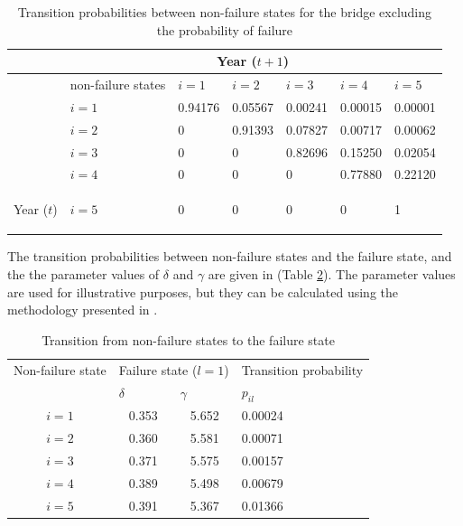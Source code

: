\documentclass[]{article}
\begin{document}
\begin{table}[H]
\caption{Transition probabilities between non-failure states for the bridge
excluding the probability of failure}
\begin{centering}
\begin{tabular}{l|l|lllll}
\hline 
\multicolumn{1}{l}{} & \multicolumn{6}{c}{Year ($t+1$)}\tabularnewline
\hline 
 & non-failure states  & $i=1$  & $i=2$  & $i=3$  & $i=4$  & $i=5$ \tabularnewline
\hline 
 & $i=1$  & 0.94176  & 0.05567  & 0.00241  & 0.00015  & 0.00001 \tabularnewline
 & $i=2$  & 0  & 0.91393  & 0.07827  & 0.00717  & 0.00062 \tabularnewline
 & $i=3$  & 0  & 0  & 0.82696  & 0.15250  & 0.02054 \tabularnewline
 & $i=4$  & 0  & 0  & 0  & 0.77880  & 0.22120 \tabularnewline
\begin{rotate}{90} Year ($t$) \end{rotate}  & $i=5$  & 0  & 0  & 0  & 0  & 1 \tabularnewline
\hline 
\end{tabular}
\par\end{centering}
\label{transitionmatrixa} 
\end{table}
The transition probabilities between non-failure states and the failure
state, and the the parameter values of $\delta$ and $\gamma$ are
given in (Table \ref{alphagammavalue}). The parameter values are used for illustrative purposes, but they can be calculated using the methodology presented in \citet{Schultz2010}. 
\begin{table}[H]
\caption{Transition from non-failure states to the failure state}
\begin{centering}
\begin{tabular}{l|l|l|l}
\hline 
\multicolumn{1}{c|}{Non-failure state} & \multicolumn{2}{c|}{Failure state ($l=1$)} & Transition probability\tabularnewline
\cline{2-4} 
\multicolumn{1}{c|}{} & $\delta$  & $\gamma$  & $p_{il}$\tabularnewline
\hline 
\multicolumn{1}{c|}{$i=1$} & \multicolumn{1}{c|}{0.353} & \multicolumn{1}{c|}{5.652} & 0.00024 \tabularnewline
\hline 
\multicolumn{1}{c|}{$i=2$} & \multicolumn{1}{c|}{0.360} & \multicolumn{1}{c|}{5.581} & 0.00071 \tabularnewline
\hline 
\multicolumn{1}{c|}{$i=3$} & \multicolumn{1}{c|}{0.371} & \multicolumn{1}{c|}{5.575} & 0.00157 \tabularnewline
\hline 
\multicolumn{1}{c|}{$i=4$} & \multicolumn{1}{c|}{0.389} & \multicolumn{1}{c|}{5.498} & 0.00679 \tabularnewline
\hline 
\multicolumn{1}{c|}{$i=5$} & \multicolumn{1}{c|}{0.391} & \multicolumn{1}{c|}{5.367} & 0.01366 \tabularnewline
\hline 
\end{tabular}
\par\end{centering}
\label{alphagammavalue} 
\end{table}
\end{document}
